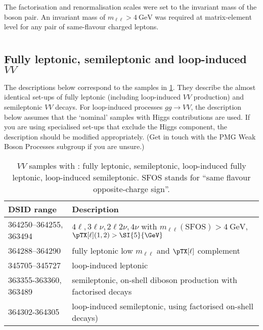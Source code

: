 The factorisation and renormalisation scales were set to the invariant mass of
the boson pair. An invariant mass of \(m_{\ell\ell} > \SI{4}{\GeV}\) was required
at matrix-element level for any pair of same-flavour charged leptons.


\section[Sherpa]{\SHERPA}

\subsection{Fully leptonic, semileptonic and loop-induced \texorpdfstring{\(VV\)}{VV}}

The descriptions below correspond to the samples in
\cref{tab:MB-sherpa}. They describe the almost
identical set-ups of fully leptonic (including loop-induced \(VV\) production)
and semileptonic \(VV\) decays. For loop-induced processes \(gg\to VV\),
the description below assumes that the `nominal' samples with
Higgs contributions are used. If you are using specialised set-ups that
exclude the Higgs component, the description should be modified appropriately.
(Get in touch with the PMG Weak Boson Processes subgroup if you are unsure.)

\begin{table}[htbp]
  \caption{\(VV\) samples with \SHERPA: fully leptonic, semileptonic,
    loop-induced fully leptonic, loop-induced semileptonic. SFOS stands for
    \enquote{same flavour opposite-charge sign}.}%
  \label{tab:MB-sherpa}
  \centering
  \begin{tabular}{l l}
    \toprule
    DSID range & Description \\
    \midrule
    364250--364255, 363494   & \(4\ell, 3\ell\nu, 2\ell 2\nu, 4\nu\) with \(m_{\ell\ell}\mathrm{(SFOS)} > \SI{4}{\GeV}\), \(\pTX[\ell](1,2) > \SI{5}{\GeV}\)\\
    364288--364290 & fully leptonic low \(m_{\ell\ell}\) and \(\pTX[\ell]\) complement\\
    \midrule
    345705--345727   & loop-induced leptonic\\
    \midrule
    363355-363360, 363489   & semileptonic, on-shell diboson production with factorised decays\\
    \midrule
    364302-364305   & loop-induced semileptonic, using factorised on-shell decays)\\
    \bottomrule
  \end{tabular}
\end{table}

